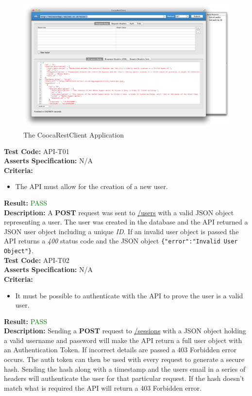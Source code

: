 \documentclass[11pt,a4paper]{report}
\begin{document}
\begin{figure}[H]
   \centering
   \includegraphics[width=\textwidth]{CoocaRestClient} %
   \caption{The CoocaRestClient Application}
   \label{fig:coocaRest}
\end{figure}

\label{test:API-T01}
\noindent\textbf{Test Code:} API-T01\\
\textbf{Asserts Specification:} N/A \\ 
\textbf{Criteria:} \begin{itemize}
                     \item The API must allow for the creation of a new user.
                   \end{itemize}  
\textbf{Result:} \textcolor{green}{PASS}\\ 
\textbf{Description:} A \textbf{POST} request was sent to \url{/users} with a valid JSON object representing a user. The user was created in the database and the API returned a JSON user object including a unique \textit{ID}. If an invalid user object is passed the API returns a \textit{400} status code and the JSON object \lstinline${"error":"Invalid User Object"}$.\\ 

\label{test:API-T02}
\noindent\textbf{Test Code:} API-T02\\
\textbf{Asserts Specification:} N/A \\ 
\textbf{Criteria:} \begin{itemize}
                     \item It must be possible to authenticate with the API to prove the user is a valid user. 
                   \end{itemize}  
\textbf{Result:} \textcolor{green}{PASS}\\ 
\textbf{Description:} Sending a \textbf{POST} request to \url{/sessions} with a JSON object holding a valid username and password will make the API return a full user object with an Authentication Token. If incorrect details are passed a 403 Forbidden error occurs. The auth token can then be used with every request to generate a secure hash. Sending the hash along with a timestamp and the users email in a series of headers will authenticate the user for that particular request. If the hash doesn't match what is required the API will return a 403 Forbidden error. \\ 
\end{document}
